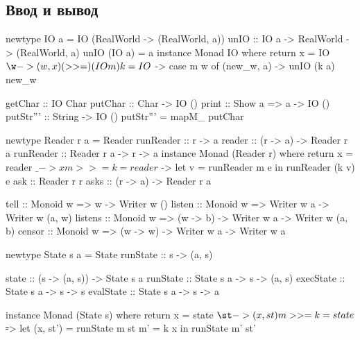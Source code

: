 \documentclass[11pt,a4paper]{article}
\begin{document}
\subsection{Ввод и вывод}
\begin{minipage}{0.6\textwidth}
\begin{hscode}
newtype IO a = IO (RealWorld -> (RealWorld, a))
unIO :: IO a -> RealWorld -> (RealWorld, a)
unIO (IO a) = a
instance Monad IO where
	return x = IO $ \w -> (w, x)
	(>>=) (IO m) k = IO $ 
		\w -> case m w of (new_w, a) -> unIO (k a) new_w
\end{hscode}
\end{minipage}
\hfill
\begin{minipage}{0.35\textwidth}
\begin{hscode}
getChar :: IO Char
putChar :: Char -> IO ()
print :: Show a => a -> IO ()
putStr''' :: String -> IO ()
putStr''' = mapM_ putChar
\end{hscode}
\end{minipage}
\begin{hscode}
newtype Reader r a = Reader { runReader :: r -> a }
reader :: (r -> a) -> Reader r a
runReader :: Reader r a -> r -> a
instance Monad (Reader r) where
	return x = reader $ \_ -> x
	m >>= k = reader $ \e -> let v = runReader m e in runReader (k v) e
ask :: Reader r r
asks :: (r -> a) -> Reader r a
\end{hscode}
\begin{minipage}{0.55\textwidth}
\end{minipage}
\hfill
\begin{minipage}{0.42\textwidth}
\begin{hscode}
tell :: Monoid w => w -> Writer w ()
listen :: Monoid w => 
		Writer w a -> Writer w (a, w)
listens :: Monoid w =>
		(w -> b) -> Writer w a -> Writer w (a, b)
censor :: Monoid w => 
		(w -> w) -> Writer w a -> Writer w a
\end{hscode}
\end{minipage}
\begin{minipage}{0.55\textwidth}
\begin{hscode}
newtype State s a = State { runState :: s -> (a, s) }

state :: (s -> (a, s)) -> State s a
runState :: State s a -> s -> (a, s)
execState :: State s a -> s -> s
evalState :: State s a -> s -> a

instance Monad (State s) where 
	return x = state $ \st -> (x, st)
	m >>= k = state $ \st -> let (x, st') = runState m st
	                             m' =  k x
                             in runState m' st'
\end{hscode}
\end{minipage}
\end{document}
